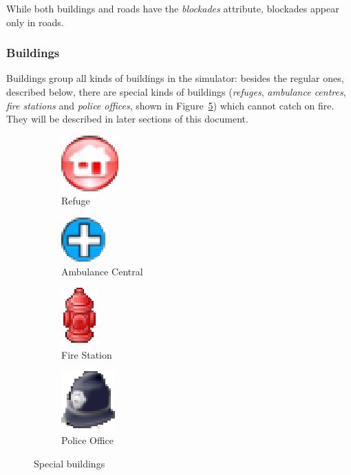 \documentclass{article}
\begin{document}
While both buildings and roads have the \emph{blockades} attribute, blockades appear only in roads.
\subsubsection{Buildings}

Buildings group all kinds of buildings in the simulator: besides the regular ones, described below, there are special kinds of buildings (\emph{refuges}, \emph{ambulance centres}, \emph{fire stations} and \emph{police offices}, shown in Figure~\ref{fig:special_buildings}) which cannot catch on fire. They will be described in later sections of this document.
\begin{figure}[htp]
  \centering
  \begin{subfigure}[hb]{0.45\textwidth}
    \centering
    \includegraphics[scale=0.6]{figs/refuge.eps}
    \caption{Refuge}
    \label{fig:refuge}
  \end{subfigure}
  \begin{subfigure}[hb]{0.45\textwidth}
    \centering
    \includegraphics[scale=0.6]{figs/ambulance_central.eps}
    \caption{Ambulance Central}
    \label{fig:ambulance_central}
  \end{subfigure}

  \begin{subfigure}[hb]{0.45\textwidth}
    \centering
    \includegraphics[scale=0.6]{figs/fire_station.eps}
    \caption{Fire Station}
    \label{fig:fire_station}
  \end{subfigure}
  \begin{subfigure}[hb]{0.45\textwidth}
    \centering
    \includegraphics[scale=0.6]{figs/police_office.eps}
    \caption{Police Office}
    \label{fig:police_office}
  \end{subfigure}

  \caption{Special buildings}
  \label{fig:special_buildings}
\end{figure}
\end{document}

